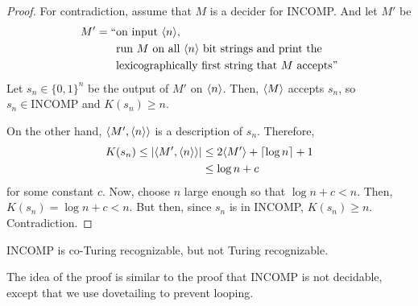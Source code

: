 \begin{proof}
    For contradiction, assume that $M$ is a decider for INCOMP. And let $M'$ be
    $$
    \begin{aligned}
        M' = `` &\text{on input $\langle n \rangle$,} \\
        &\text{run $M$ on all $\langle n \rangle$ bit strings and print the} \\
        &\text{lexicographically first string that $M$ accepts}
        "
    \end{aligned}
    $$
    Let $s_n \in \{0,1\}^n$ be the output of $M'$ on $\langle n \rangle$. Then, $\langle M \rangle$ accepts $s_n$, so $s_n \in \mathrm{INCOMP}$ and $K(s_n) \geq n$.

    On the other hand, $\langle M',\langle n \rangle \rangle$ is a description of $s_n$. Therefore,
    $$
    \begin{aligned}
        K(s_n) \leq |\langle M',\langle n \rangle \rangle| &\leq 2 \langle M' \rangle + \left\lceil \log n \right\rceil + 1 \\
        &\leq \log n + c
    \end{aligned}
    $$
    for some constant $c$. Now, choose $n$ large enough so that $\log n + c < n$. Then, $K(s_n) = \log n + c < n$. But then, since $s_n$ is in INCOMP, $K(s_n) \geq n$. Contradiction.
\end{proof}

\begin{theorem}
    INCOMP is co-Turing recognizable, but not Turing recognizable.
\end{theorem}

The idea of the proof is similar to the proof that INCOMP is not decidable, except that we use dovetailing to prevent looping.

